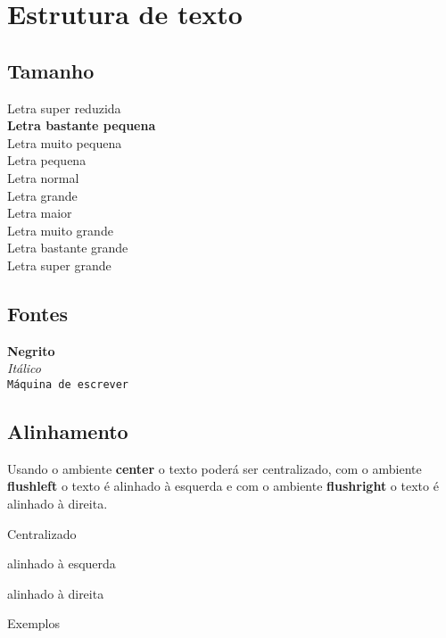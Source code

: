 \documentclass[12pt]{article} %
\begin{document}
\section{Estrutura de texto}
\subsection{Tamanho} %
{\singlespacing %

\noindent \tiny{Letra super reduzida}\\
\scriptsize{\textbf{Letra bastante pequena}}\\
\footnotesize{Letra muito pequena}\\
\small{Letra pequena}\\
\normalsize{Letra normal} \\
\large{Letra grande}\\
\Large{Letra maior}\\
\LARGE{Letra muito grande}\\
\huge{Letra bastante grande}\\
\Huge{Letra super grande}\\
}

\newpage
\subsection{Fontes}
\noindent
\textbf{Negrito}\\
\textit{Itálico} \\
\texttt{Máquina de escrever}

\subsection{Alinhamento}
Usando o ambiente \textbf{center} o texto poderá ser centralizado, com o ambiente \textbf{flushleft} o texto é alinhado à esquerda e com o ambiente \textbf{flushright} o texto é alinhado à direita.

\begin{center}
    Centralizado
\end{center}

\begin{flushleft}
alinhado à esquerda
\end{flushleft}

\begin{flushright}
alinhado à direita
\end{flushright}

Exemplos\\
\end{document}
